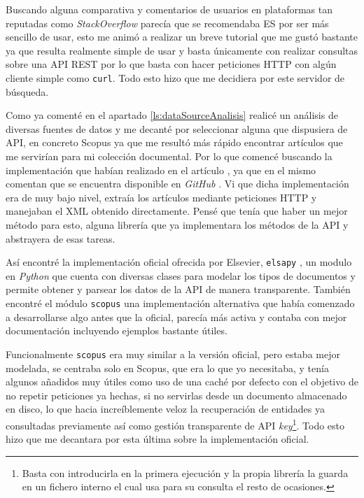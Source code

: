 Buscando alguna comparativa \cite{ES_Solr} y comentarios de usuarios en plataformas tan reputadas como \textit{StackOverflow} \cite{ES_Solr_SO} parecía que se recomendaba \acrshort{ES} por ser más sencillo de usar, esto me animó a realizar un breve tutorial \cite{ES_tutorial} que me gustó bastante ya que resulta realmente simple de usar y basta únicamente con realizar consultas sobre una \acrshort{API} \acrshort{REST} por lo que basta con hacer peticiones \acrshort{HTTP} con algún cliente simple como \texttt{curl}. Todo esto hizo que me decidiera por este servidor de búsqueda.

Como ya comenté en el apartado \ref{ls:dataSourceAnalisis} realicé un análisis de diversas fuentes de datos y me decanté por seleccionar alguna que dispusiera de \acrshort{API}, en concreto Scopus ya que me resultó más rápido encontrar artículos que me servirían para mi colección documental. Por lo que comencé buscando la implementación que habían realizado en el artículo \cite{DBLP:conf/ecir/SarolLS18}, ya que en el mismo comentan que se encuentra disponible en \textit{GitHub} \cite{bir_scopus_gh}. Vi que dicha implementación era de muy bajo nivel, extraía los artículos mediante peticiones \acrshort{HTTP} y manejaban el \acrshort{XML} obtenido directamente. Pensé que tenía que haber un mejor método para esto, alguna librería que ya implementara los métodos de la \acrshort{API} y abstrayera de esas tareas. 

Así encontré la implementación oficial ofrecida por Elsevier, \texttt{elsapy} \cite{elsapy}, un modulo en \textit{Python} que cuenta con diversas clases para modelar los tipos de documentos y permite obtener y parsear los datos de la \acrshort{API} de manera transparente. También encontré el módulo \texttt{scopus} \cite{scopus-api} una implementación alternativa que había comenzado a desarrollarse algo antes que la oficial, parecía más activa y contaba con mejor documentación incluyendo ejemplos bastante útiles. 

Funcionalmente \texttt{scopus} era muy similar a la versión oficial, pero estaba mejor modelada, se centraba solo en Scopus, que era lo que yo necesitaba, y tenía algunos añadidos muy útiles como uso de una caché por defecto con el objetivo de no repetir peticiones ya hechas, si no servirlas desde un documento almacenado en disco, lo que hacia increíblemente veloz la recuperación de entidades ya consultadas previamente así como gestión transparente de \acrshort{API} \textit{key}\footnote[3]{Basta con introducirla en la primera ejecución y la propia librería la guarda en un fichero interno el cual usa para su consulta el resto de ocasiones.}. Todo esto hizo que me decantara por esta última sobre la implementación oficial.

